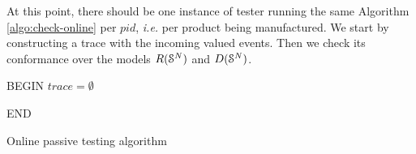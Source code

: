 At this point, there should be one instance of tester running the
same Algorithm \ref{algo:check-online} per $pid$, \emph{i.e.} per
product being manufactured. We start by constructing a trace with
the incoming valued events. Then we check its conformance over
the models $R(\EuScript{S}^{N})$ and $D(\EuScript{S}^{N})$.

\begin{algorithm}[h]


    BEGIN\;
    $trace = \emptyset$\;


    END\;

    \caption{Online passive testing algorithm}
    \label{algo:check-online}
\end{algorithm}
